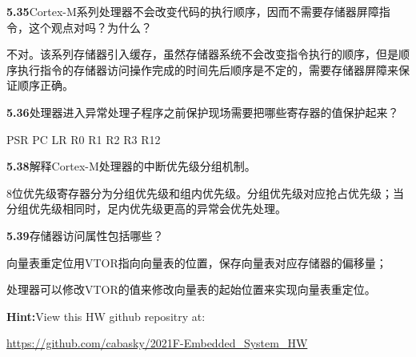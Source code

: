 \documentclass{article}
\begin{document}
    \noindent\textbf{5.35}Cortex-M系列处理器不会改变代码的执行顺序，因而不需要存储器屏障指令，这个观点对吗？为什么？\par
    不对。该系列存储器引入缓存，虽然存储器系统不会改变指令执行的顺序，但是顺序执行指令的存储器访问操作完成的时间先后顺序是不定的，需要存储器屏障来保证顺序正确。
    \\[4pt]\par

    \noindent\textbf{5.36}处理器进入异常处理子程序之前保护现场需要把哪些寄存器的值保护起来？\par
    PSR PC LR R0 R1 R2 R3 R12
    \\[4pt]\par

    \noindent\textbf{5.38}解释Cortex-M处理器的中断优先级分组机制。\par
    8位优先级寄存器分为分组优先级和组内优先级。分组优先级对应抢占优先级；当分组优先级相同时，足内优先级更高的异常会优先处理。
    \\[4pt]\par

    \noindent\textbf{5.39}存储器访问属性包括哪些？\par
    向量表重定位用VTOR指向向量表的位置，保存向量表对应存储器的偏移量；\par
    处理器可以修改VTOR的值来修改向量表的起始位置来实现向量表重定位。
    \\[4pt]\par

    \noindent\textbf{Hint:}\quad View this HW github repositry at:\par
    \quad \url{https://github.com/cabasky/2021F-Embedded_System_HW}
    \\[4pt]\par
\end{document}
